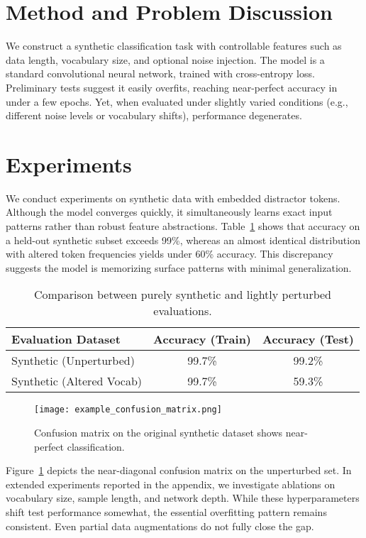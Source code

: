 \documentclass[11pt]{article}
\begin{document}
\section{Method and Problem Discussion}
We construct a synthetic classification task with controllable features such as data length, vocabulary size, and optional noise injection. The model is a standard convolutional neural network, trained with cross-entropy loss. Preliminary tests suggest it easily overfits, reaching near-perfect accuracy in under a few epochs. Yet, when evaluated under slightly varied conditions (e.g., different noise levels or vocabulary shifts), performance degenerates.

\section{Experiments}
We conduct experiments on synthetic data with embedded distractor tokens. Although the model converges quickly, it simultaneously learns exact input patterns rather than robust feature abstractions. Table~\ref{tab:results} shows that accuracy on a held-out synthetic subset exceeds 99\%, whereas an almost identical distribution with altered token frequencies yields under 60\% accuracy. This discrepancy suggests the model is memorizing surface patterns with minimal generalization.

\begin{table}[t]
\centering
\caption{Comparison between purely synthetic and lightly perturbed evaluations.}
\label{tab:results}
\begin{tabular}{@{}lcc@{}}
\toprule
Evaluation Dataset & Accuracy (Train) & Accuracy (Test) \\
\midrule
Synthetic (Unperturbed) & 99.7\% & 99.2\% \\
Synthetic (Altered Vocab) & 99.7\% & 59.3\% \\
\bottomrule
\end{tabular}
\end{table}

\begin{figure}[t]
\centering
\texttt{[image: example\_confusion\_matrix.png]}
\caption{Confusion matrix on the original synthetic dataset shows near-perfect classification.}
\label{fig:conf-matrix}
\end{figure}

Figure~\ref{fig:conf-matrix} depicts the near-diagonal confusion matrix on the unperturbed set. In extended experiments reported in the appendix, we investigate ablations on vocabulary size, sample length, and network depth. While these hyperparameters shift test performance somewhat, the essential overfitting pattern remains consistent. Even partial data augmentations do not fully close the gap.
\end{document}
